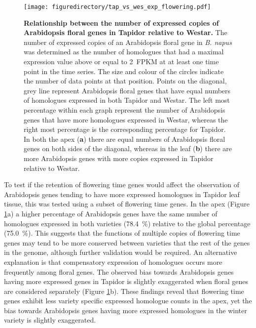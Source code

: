 \documentclass[12pt,]{book}
\begin{document}
\begin{figure}[htbp]
\centering
\texttt{[image: figuredirectory/tap\_vs\_wes\_exp\_flowering.pdf]}
\caption{\textbf{Relationship between the number of expressed copies of
Arabidopsis floral genes in Tapidor relative to Westar.} The number of
expressed copies of an Arabidopsis floral gene in \emph{B. napus} was
determined as the number of homologues that had a maximal expression
value above or equal to 2~FPKM at at least one time point in the time
series. The size and colour of the circles indicate the number of data
points at that position. Points on the diagonal, grey line represent
Arabidopsis floral genes that have equal numbers of homologues expressed
in both Tapidor and Westar. The left most percentage within each graph
represent the number of Arabidopsis genes that have more homologues
expressed in Westar, whereas the right most percentage is the
corresponding percentage for Tapidor. In both the apex (\textbf{a})
there are equal numbers of Arabidopsis floral genes on both sides of the
diagonal, whereas in the leaf (\textbf{b}) there are more Arabidopsis
genes with more copies expressed in Tapidor relative to
Westar.}\label{figure:3xx:tapvswesflor}
\end{figure}

To test if the retention of flowering time genes would affect the
observation of Arabidopsis genes tending to have more expressed
homologues in Tapidor leaf tissue, this was tested using a subset of
flowering time genes. In the apex (Figure
\ref{figure:3xx:tapvswesflor}a) a higher percentage of Arabidopsis genes
have the same number of homologues expressed in both varieties (78.4~\%)
relative to the global percentage (75.0~\%). This suggests that the
functions of multiple copies of flowering time genes may tend to be more
conserved between varieties that the rest of the genes in the genome,
although further validation would be required. An alternative
explanation is that compensatory expression of homologues occurs more
frequently among floral genes. The observed bias towards Arabidopsis
genes having more expressed genes in Tapidor is slightly exaggerated
when floral genes are considered separately (Figure
\ref{figure:3xx:tapvswesflor}b). These findings reveal that flowering
time genes exhibit less variety specific expressed homologue counts in
the apex, yet the bias towards Arabidopsis genes having more expressed
homologues in the winter variety is slightly exaggerated.
\end{document}
